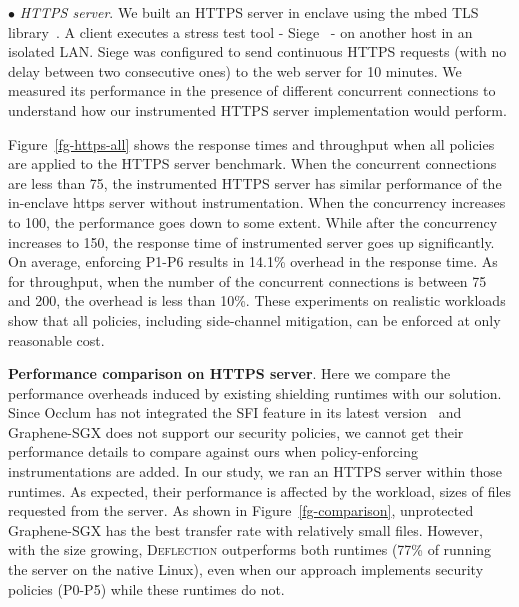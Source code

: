 
%

\vspace{2pt}\noindent$\bullet$\textit{ HTTPS server}. We built an HTTPS server in enclave using the mbed TLS library~\cite{mbedtls}. %
\DIFaddbegin {}\DIFaddend A client executes a stress test tool - Siege~\cite{siege} - on another host in an isolated LAN. Siege was configured to send continuous HTTPS requests (with no delay between two consecutive ones) to the web server for 10 minutes. We measured its performance in the presence of different concurrent connections to understand how our instrumented HTTPS server implementation would perform. 

%

Figure~\ref{fg-https-all} shows the response times and throughput when all policies are applied to the HTTPS server benchmark. When the concurrent connections are less than 75, the instrumented HTTPS server has similar performance of the in-enclave https server without instrumentation. When the concurrency increases to 100, the performance goes down to some extent. 
While after the concurrency increases to 150, the response time of instrumented server goes up significantly. On average, enforcing P1-P6 results in 14.1\% overhead in the response time. As for throughput, when the number of the concurrent connections is between 75 and 200, the overhead is less than 10\%. 
These experiments on realistic workloads show that all policies, including side-channel mitigation, can be enforced at only reasonable cost. 


\vspace{3pt}\noindent\textbf{Performance comparison on HTTPS server}.
Here we compare the performance overheads induced by existing shielding runtimes with our solution. Since Occlum has not integrated the SFI feature in its latest version~\cite{occlum} and Graphene-SGX does not support our security policies, we cannot get their performance details to compare against ours when policy-enforcing instrumentations are added. In our study, we ran an HTTPS server within those runtimes. As expected, their performance is affected by the workload, sizes of files requested from the server. As shown in Figure~\ref{fg-comparison}, unprotected Graphene-SGX has the best transfer rate with relatively small files. However, with the size growing, \textsc{Deflection} outperforms both runtimes (77\% of running the server on the native Linux), even when our approach implements security policies (P0-P5) while these runtimes do not. 


